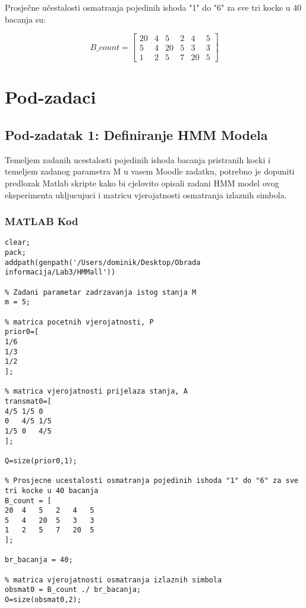 \documentclass[12pt]{article}
\begin{document}
	
	Prosječne učestalosti osmatranja pojedinih ishoda "1" do "6" za sve tri kocke u 40 bacanja su:
	
	\begin{equation}
		B\_count =\begin{bmatrix}
			20 & 4 & 5 & 2 & 4 & 5 \\
			5  & 4 & 20 & 5 & 3 & 3 \\
			1  & 2 & 5 & 7 & 20 & 5
		\end{bmatrix}
	\end{equation}
	
	
	\section{Pod-zadaci}
	
	\subsection{Pod-zadatak 1: Definiranje HMM Modela}
	Temeljem zadanih ucestalosti pojedinih ishoda bacanja pristranih kocki i temeljem zadanog parametra M u vasem Moodle zadatku,
	potrebno je dopuniti predlozak Matlab skripte kako bi cjelovito opisali zadani HMM model ovog eksperimenta ukljucujuci i matricu
	vjerojatnosti osmatranja izlaznih simbola.
	
	\subsubsection*{MATLAB Kod}
	\begin{lstlisting}
clear;
pack;
addpath(genpath('/Users/dominik/Desktop/Obrada informacija/Lab3/HMMall'))

% Zadani parametar zadrzavanja istog stanja M
m = 5;           

% matrica pocetnih vjerojatnosti, P
prior0=[    
1/6
1/3
1/2                 
];

% matrica vjerojatnosti prijelaza stanja, A
transmat0=[
4/5 1/5 0
0   4/5 1/5            
1/5 0   4/5
];

Q=size(prior0,1);

% Prosjecne ucestalosti osmatranja pojedinih ishoda "1" do "6" za sve tri kocke u 40 bacanja
B_count = [
20  4   5   2   4   5
5   4   20  5   3   3
1   2   5   7   20  5            
];

br_bacanja = 40;

% matrica vjerojatnosti osmatranja izlaznih simbola
obsmat0 = B_count ./ br_bacanja;
O=size(obsmat0,2);
	\end{lstlisting}
	
\end{document}
